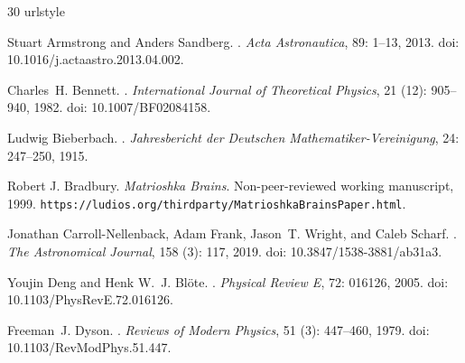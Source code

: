 \documentclass[11pt,a4paper]{article}
\theoremstyle{definition}
\begin{document}
\clearpage
\begin{thebibliography}{30}
\providecommand{\natexlab}[1]{#1}
\providecommand{\url}[1]{\texttt{#1}}
\expandafter\ifx\csname urlstyle\endcsname\relax
  \providecommand{\doi}[1]{doi: #1}\else
  \providecommand{\doi}{doi: \begingroup \urlstyle{rm}\Url}\fi

Stuart Armstrong and Anders Sandberg.
.
\newblock \emph{Acta Astronautica}, 89: 1--13, 2013.
\newblock \doi{10.1016/j.actaastro.2013.04.002}.

Charles~H. Bennett.
.
\newblock \emph{International Journal of Theoretical Physics}, 21
  (12): 905--940, 1982.
\newblock \doi{10.1007/BF02084158}.

Ludwig Bieberbach.
.
\newblock \emph{Jahresbericht der Deutschen Mathematiker-Vereinigung},
  24: 247--250, 1915.

Robert J. Bradbury.
\newblock \emph{Matrioshka Brains}.
\newblock Non-peer-reviewed working manuscript, 1999.
\newblock \url{https://ludios.org/thirdparty/MatrioshkaBrainsPaper.html}.

Jonathan Carroll-Nellenback, Adam Frank, Jason~T. Wright, and Caleb Scharf.
.
\newblock \emph{The Astronomical Journal}, 158 (3): 117,
  2019.
\newblock \doi{10.3847/1538-3881/ab31a3}.

Youjin Deng and Henk W.~J. Bl\"ote.
.
\newblock \emph{Physical Review E}, 72: 016126, 2005.
\newblock \doi{10.1103/PhysRevE.72.016126}.

Freeman~J. Dyson.
.
\newblock \emph{Reviews of Modern Physics}, 51 (3): 447--460,
  1979.
\newblock \doi{10.1103/RevModPhys.51.447}.


\end{thebibliography}
\end{document}
